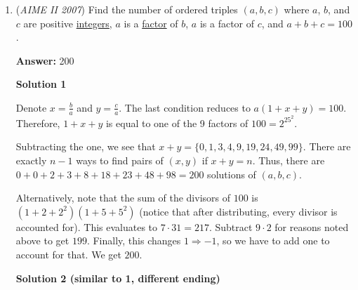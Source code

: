 \begin{enumerate}
 \textbf{Case 3: 2 letters}

 No base form with no zeroes exists. Therefore, the base form has one zero. Then it takes the form $AI207$, which is $6 \cdot 5!$ ways. Otherwise, it has two zeroes, and the base form is $AI00x$ with $x \in \{2,7 \}$. Then, there are $\frac{5!}{2!} \cdot 2 \cdot 6$ cases here. Summing, we have 1440 cases.

 \textbf{Case 4: 1 letter}

 The number 2007 must be in the string. Otherwise, we have 4 choices for the letter, and $\frac{5!}{2!}$ total arrangements. Then, we have $\frac{5!}{2!} \cdot 4 = 240$ cases.

 Every subcase here ends in a 0, so when the total count $N$ is divided by 10, we just remove the 0's in the subcases. The requested $N$ is then $24 + 144 + 168+36 = \boxed{372}$.

 


	\item (\textit{AIME II 2007}) Find the number of ordered triples $(a,b,c)$ where $a$, $b$, and $c$ are positive \href{https://artofproblemsolving.com/wiki/index.php?title=Integer}{integers}, $a$ is a \href{https://artofproblemsolving.com/wiki/index.php?title=Factor}{factor} of $b$, $a$ is a factor of $c$, and $a+b+c=100$.


 
 \textbf{Answer: }200



\textbf{Solution 1}

Denote $x = \frac{b}{a}$ and $y = \frac{c}{a}$. The last condition reduces to $a(1 + x + y) = 100$. Therefore, $1 + x + y$ is equal to one of the 9 factors of $100 = 2^25^2$.

 Subtracting the one, we see that $x + y = \{0,1,3,4,9,19,24,49,99\}$. There are exactly $n - 1$ ways to find pairs of $(x,y)$ if $x + y = n$. Thus, there are $0 + 0 + 2 + 3 + 8 + 18 + 23 + 48 + 98 = \boxed{200}$ solutions of $(a,b,c)$.

 Alternatively, note that the sum of the divisors of $100$ is $(1 + 2 + 2^2)(1 + 5 + 5^2)$ (notice that after distributing, every divisor is accounted for). This evaluates to $7 \cdot 31 = 217$. Subtract $9 \cdot 2$ for reasons noted above to get $199$. Finally, this changes $1 \Rightarrow -1$, so we have to add one to account for that. We get $\boxed{200}$.

 



\textbf{Solution 2 (similar to 1, different ending)}


\end{enumerate}
